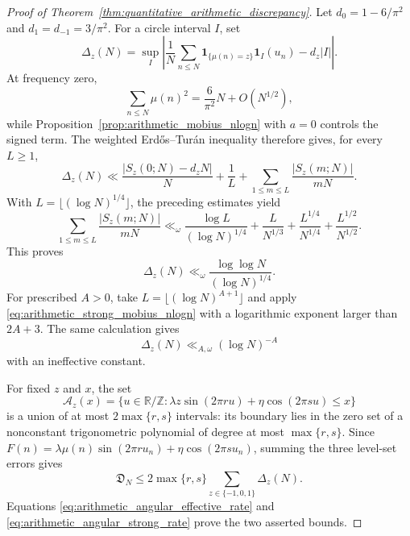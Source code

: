 \documentclass[11pt]{amsart}
\numberwithin{equation}{section}\setcounter{tocdepth}{3}\setcounter{secnumdepth}{3}
\begin{document}
\begin{proof}[Proof of Theorem~\ref{thm:quantitative_arithmetic_discrepancy}]
Let $d_0=1-6/\pi^2$ and $d_1=d_{-1}=3/\pi^2$.  For a circle interval $I$, set
\begin{equation}
 \Delta_z(N)=\sup_I
 \left|\frac1N\sum_{n\le N}\mathbf1_{\{\mu(n)=z\}}\mathbf1_I(u_n)
 -d_z|I|\right|.
 \label{eq:arithmetic_weighted_angular_discrepancy}
\end{equation}
At frequency zero,
\begin{equation}
 \sum_{n\le N}\mu(n)^2=\frac6{\pi^2}N+O(N^{1/2}),
 \label{eq:arithmetic_squarefree_count}
\end{equation}
while Proposition~\ref{prop:arithmetic_mobius_nlogn} with $a=0$ controls the signed
term.  The weighted Erd\H{o}s--Tur\'an inequality
\cite[Chapter~2]{KuipersNiederreiter1974} therefore gives, for every $L\ge1$,
\begin{equation}
 \Delta_z(N)\ll
 \frac{|S_z(0;N)-d_zN|}{N}+\frac1L
 +\sum_{1\le m\le L}\frac{|S_z(m;N)|}{mN}.
 \label{eq:arithmetic_weighted_erdos_turan}
\end{equation}
With $L=\lfloor(\log N)^{1/4}\rfloor$, the preceding estimates yield
\begin{equation}
 \sum_{1\le m\le L}\frac{|S_z(m;N)|}{mN}
 \ll_\omega
 \frac{\log L}{(\log N)^{1/4}}
 +\frac{L}{N^{1/3}}
 +\frac{L^{1/4}}{N^{1/4}}
 +\frac{L^{1/2}}{N^{1/2}}.
 \label{eq:arithmetic_effective_fourier_total}
\end{equation}
This proves
\begin{equation}
 \Delta_z(N)\ll_\omega
 \frac{\log\log N}{(\log N)^{1/4}}.
 \label{eq:arithmetic_angular_effective_rate}
\end{equation}
For prescribed $A>0$, take $L=\lfloor(\log N)^{A+1}\rfloor$ and apply
\eqref{eq:arithmetic_strong_mobius_nlogn} with a logarithmic exponent larger than
$2A+3$.  The same calculation gives
\begin{equation}
 \Delta_z(N)\ll_{A,\omega}(\log N)^{-A}
 \label{eq:arithmetic_angular_strong_rate}
\end{equation}
with an ineffective constant.

For fixed $z$ and $x$, the set
\begin{equation}
 \mathcal A_z(x)=\{u\in\mathbb R/\mathbb Z:
 \lambda z\sin(2\pi r u)+\eta\cos(2\pi s u)\le x\}
 \label{eq:arithmetic_branch_sublevel_set}
\end{equation}
is a union of at most $2\max\{r,s\}$ intervals: its boundary lies in the zero set of
a nonconstant trigonometric polynomial of degree at most $\max\{r,s\}$.  Since
$F(n)=\lambda\mu(n)\sin(2\pi r u_n)+\eta\cos(2\pi s u_n)$, summing the three level-set
errors gives
\begin{equation}
 \mathfrak D_N
 \le2\max\{r,s\}\sum_{z\in\{-1,0,1\}}\Delta_z(N).
 \label{eq:arithmetic_cdf_transfer}
\end{equation}
Equations \eqref{eq:arithmetic_angular_effective_rate} and
\eqref{eq:arithmetic_angular_strong_rate} prove the two asserted bounds.
\end{proof}
\end{document}
